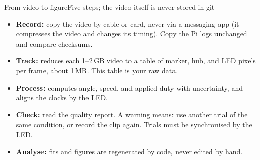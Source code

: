 %
\begin{frame}{From video to figure}{Five steps; the video itself is never stored in git}
  \footnotesize
  \centering

  \vspace{6pt}
  \raggedright
  \begin{itemize}\setlength{\itemsep}{2pt}
    \item \textbf{Record:} copy the video by cable or card, never via a messaging app (it compresses the video and changes its timing). Copy the Pi logs unchanged and compare checksums.
    \item \textbf{Track:} reduces each 1--2\,GB video to a table of marker, hub, and LED pixels per frame, about 1\,MB. This table is your \alert{raw data}.
    \item \textbf{Process:} computes angle, speed, and applied duty with uncertainty, and aligns the clocks by the LED.
    \item \textbf{Check:} read the quality report. A warning means: use another trial of the same condition, or record the clip again. Trials must be synchronised by the LED.
    \item \textbf{Analyse:} fits and figures are \alert{regenerated by code}, never edited by hand.
  \end{itemize}
\end{frame}
